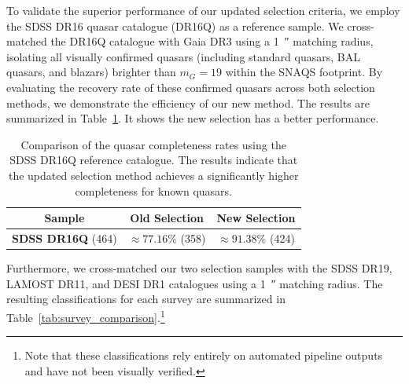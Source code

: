 To validate the superior performance of our updated selection criteria, we employ the SDSS DR16 quasar catalogue (DR16Q) as a reference sample. We cross-matched the DR16Q catalogue with Gaia DR3 using a \qty{1}{\arcsecond} matching radius, isolating all visually confirmed quasars (including standard quasars, BAL quasars, and blazars) brighter than $m_G = 19$ within the SNAQS footprint. By evaluating the recovery rate of these confirmed quasars across both selection methods, we demonstrate the efficiency of our new method. The results are summarized in Table~\ref{tab:sdss_dr16q_comp}. It shows the new selection has a better performance.

\begin{table}[htbp]
    \centering
    \begin{tabular}{c c c}
    \toprule
    Sample & Old Selection & New Selection \\
    \midrule
    \textbf{SDSS DR16Q} (\num{464}) & $\approx 77.16\%$ (\num{358}) & $\approx 91.38\%$ (\num{424}) \\
    \bottomrule
    \end{tabular}
    \caption{Comparison of the quasar completeness rates using the SDSS DR16Q reference catalogue. The results indicate that the updated selection method achieves a significantly higher completeness for known quasars.}
    \label{tab:sdss_dr16q_comp}
\end{table}

Furthermore, we cross-matched our two selection samples with the SDSS DR19, LAMOST DR11, and DESI DR1 catalogues using a \qty{1}{\arcsecond} matching radius. The resulting classifications for each survey are summarized in Table~\ref{tab:survey_comparison}.\footnote{Note that these classifications rely entirely on automated pipeline outputs and have not been visually verified.\label{fn:auto_pipeline}}

